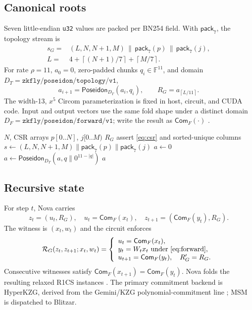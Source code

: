 \documentclass[9pt,twocolumn]{extarticle}
\newcommand{\F}{\mathbb{F}}
\newcommand{\Commit}{\mathsf{Com}}
\newcommand{\Poseidon}{\mathsf{Poseidon}}
\newcommand{\ceil}[1]{\left\lceil #1\right\rceil}
\newcommand{\code}[1]{\texttt{#1}}
\begin{document}
\subsection{Canonical roots}

Seven little-endian \code{u32} values are packed per BN254 field.  With
$\mathsf{pack}_7$, the topology stream is
\begin{align}
  s_G={}&(L,N,N+1,M)\,\|\,\mathsf{pack}_7(p)\,\|\,
          \mathsf{pack}_7(j),                                \label{eq:stream}\\
  L={}&4+\ceil{(N+1)/7}+\ceil{M/7}.                          \label{eq:fields}
\end{align}
For rate $\rho=11$, $a_0=0$, zero-padded chunks $q_i\in\F^{11}$, and domain
$D_T=\code{zkfly/poseidon/topology/v1}$,
\begin{equation}
  a_{i+1}=\Poseidon_{D_T}(a_i,q_i),\qquad R_G=a_{\ceil{L/11}}. \label{eq:topology-fold}
\end{equation}
The width-13, $x^5$ Circom parameterization is fixed in host, circuit, and CUDA
code.  Input and output vectors use the same fold shape under a distinct domain
$D_F=\code{zkfly/poseidon/forward/v1}$; write the result as $\Commit_F(\cdot)$
\cite{grassi2021poseidon}.

\begin{algorithm}[t]
\caption{Canonical topology commitment}
\label{alg:topology}
\begin{algorithmic}[1]
\Require $N$, CSR arrays $p[0..N]$, $j[0..M)$
\Ensure $R_G$
\State assert \cref{eq:csr} and sorted-unique columns
\State $s\gets(L,N,N+1,M)\|\mathsf{pack}_7(p)\|\mathsf{pack}_7(j)$
\State $a\gets0$
  \State $a\gets\Poseidon_{D_T}(a,q\|0^{11-|q|})$
\EndFor
\State \Return $a$
\end{algorithmic}
\end{algorithm}

\subsection{Recursive state}

For step $t$, Nova carries
\begin{equation}
  z_t=(u_t,R_G),\quad u_t=\Commit_F(x_t),\quad
  z_{t+1}=(\Commit_F(y_t),R_G).                              \label{eq:state}
\end{equation}
The witness is $(x_t,w_t)$ and the circuit enforces
\begin{equation}
 \mathcal R_G(z_t,z_{t+1};x_t,w_t)=
 \left\{
 \begin{array}{l}
 u_t=\Commit_F(x_t),\\
 y_t=W_t x_t\text{ under \cref{eq:forward}},\\
 u_{t+1}=\Commit_F(y_t),\quad R'_G=R_G.
 \end{array}\right.                                        \label{eq:relation}
\end{equation}
Consecutive witnesses satisfy
$\Commit_F(x_{t+1})=\Commit_F(y_t)$.  Nova folds the resulting relaxed R1CS
instances \cite{kothapalli2021nova}.  The primary commitment backend is
HyperKZG, derived from the Gemini/KZG polynomial-commitment line
\cite{bootle2022gemini,kate2010kzg}; MSM is dispatched to Blitzar.
\end{document}
